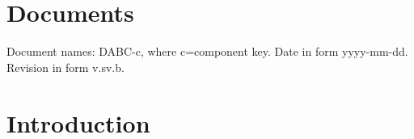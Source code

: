 \documentclass{dabcclass}
\begin{document}
 \cleardoublepage
\thispagestyle{empty} \tableofcontents \thispagestyle{empty} \cleardoublepage
{}

 \cleardoublepage
 \cleardoublepage
 \cleardoublepage

\setcounter{chapter}{0}
\chapter{Documents}
Document names: DABC-c, where c=component key. Date in form yyyy-mm-dd.
Revision in form v.sv.b.\\

%
%
%






\cleardoublepage
\chapter{Introduction}
 \cleardoublepage
\end{document}
